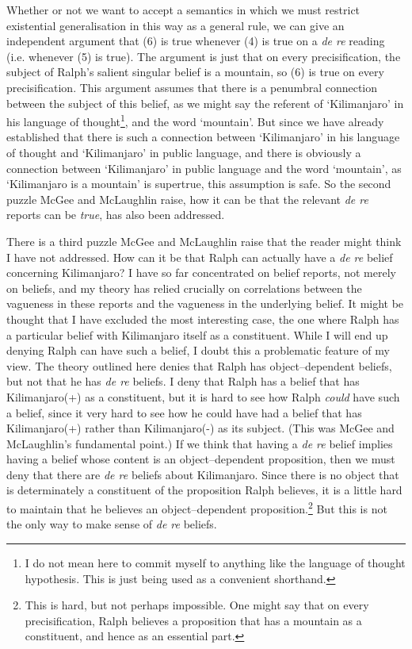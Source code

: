 \noindent Whether or not we want to accept a semantics in which we must restrict existential generalisation in this way as a general rule, we can give an independent argument that (6) is true whenever (4) is true on a \textit{de re} reading (i.e. whenever (5) is true). The argument is just that on every precisification, the subject of Ralph's salient singular belief is a mountain, so (6) is true on every precisification. This argument assumes that there is a penumbral connection between the subject of this belief, as we might say the referent of `Kilimanjaro' in his language of thought\footnote{I do not mean here to commit myself to anything like the language of thought hypothesis. This is just being used as a convenient shorthand.}, and the word `mountain'. But since we have already established that there is such a connection between `Kilimanjaro' in his language of thought and `Kilimanjaro' in public language, and there is obviously a connection between `Kilimanjaro' in public language and the word `mountain', as `Kilimanjaro is a mountain' is supertrue, this assumption is safe. So the second puzzle McGee and McLaughlin raise, how it can be that the relevant \textit{de re} reports can be \textit{true}, has also been addressed.

There is a third puzzle McGee and McLaughlin raise that the reader might think I have not addressed. How can it be that Ralph can actually have a \textit{de re} belief concerning Kilimanjaro? I have so far concentrated on belief reports, not merely on beliefs, and my theory has relied crucially on correlations between the vagueness in these reports and the vagueness in the underlying belief. It might be thought that I have excluded the most interesting case, the one where Ralph has a particular belief with Kilimanjaro itself as a constituent. While I will end up denying Ralph can have such a belief, I doubt this a problematic feature of my view. The theory outlined here denies that Ralph has object--dependent beliefs, but not that he has \textit{de re} beliefs. I deny that Ralph has a belief that has Kilimanjaro(+) as a constituent, but it is hard to see how Ralph \textit{could} have such a belief, since it very hard to see how he could have had a belief that has Kilimanjaro(+) rather than Kilimanjaro(-) as its subject. (This was McGee and McLaughlin's fundamental point.) If we think that having a \textit{de re} belief implies having a belief whose content is an object--dependent proposition, then we must deny that there are \textit{de re }beliefs about Kilimanjaro. Since there is no object that is determinately a constituent of the proposition Ralph believes, it is a little hard to maintain that he believes an object--dependent proposition.\footnote{This is hard, but not perhaps impossible. One might say that on every precisification, Ralph believes a proposition that has a mountain as a constituent, and hence as an essential part. } But this is not the only way to make sense of \textit{de re} beliefs.

